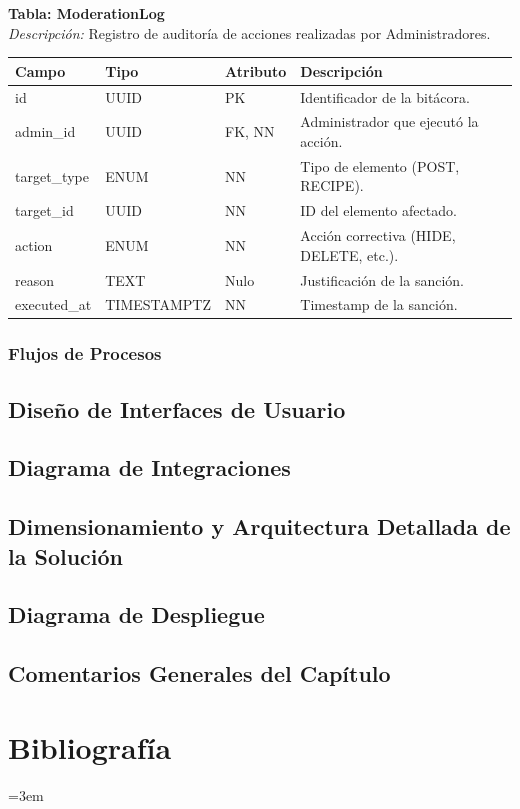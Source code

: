 \documentclass[12pt]{article}
\begin{document}
\noindent\textbf{Tabla: ModerationLog} \\
\textit{Descripción:} Registro de auditoría de acciones realizadas por Administradores.
\begin{table}[h!]
    \centering
    \renewcommand{\arraystretch}{1.2}
    \small
    \begin{tabular}{|p{3.5cm}|p{2.7cm}|p{2cm}|p{6.5cm}|}
        \hline
        \rowcolor[HTML]{EFEFEF}
        \textbf{Campo} & \textbf{Tipo} & \textbf{Atributo} & \textbf{Descripción} \\ \hline
        id & UUID & PK & Identificador de la bitácora. \\ \hline
        admin\_id & UUID & FK, NN & Administrador que ejecutó la acción. \\ \hline
        target\_type & ENUM & NN & Tipo de elemento (POST, RECIPE). \\ \hline
        target\_id & UUID & NN & ID del elemento afectado. \\ \hline
        action & ENUM & NN & Acción correctiva (HIDE, DELETE, etc.). \\ \hline
        reason & TEXT & Nulo & Justificación de la sanción. \\ \hline
        executed\_at & TIMESTAMPTZ & NN & Timestamp de la sanción. \\ \hline
    \end{tabular}
\end{table}
\subsubsection{Flujos de Procesos}
\subsection{Diseño de Interfaces de Usuario}
\subsection{Diagrama de Integraciones}
\subsection{Dimensionamiento y Arquitectura Detallada de la Solución}
\subsection{Diagrama de Despliegue}
\subsection{Comentarios Generales del Capítulo}
\newpage
\section{Bibliografía}
\begingroup
\sloppy
\emergencystretch=3em
\printbibliography[heading=none]
\endgroup
\end{document}
